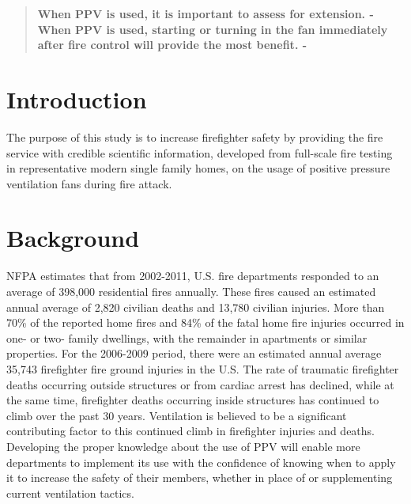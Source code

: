 \documentclass{article}
\begin{document}
\begin{abstract}
\noindent \bf{When PPV is used, it is important to assess for extension.} - \\

\noindent \bf{When PPV is used, starting or turning in the fan immediately after fire control will provide the most benefit.} - \\

\end{abstract}

\newpage

\tableofcontents

\newpage

\section*{Introduction}
The purpose of this study is to increase firefighter safety by providing the fire service with credible scientific information, developed from full-scale fire testing in representative modern single family homes, on the usage of positive pressure ventilation fans during fire attack. 

\clearpage

\section{Background}
NFPA estimates \cite{NFPAFireLoss} that from 2002-2011, U.S. fire departments responded to an average of 398,000 residential fires annually. These fires caused an estimated annual average of 2,820 civilian deaths and 13,780 civilian injuries. More than 70\% of the reported home fires and 84\% of the fatal home fire injuries occurred in one- or two- family dwellings, with the remainder in apartments or similar properties. For the 2006-2009 period, there were an estimated annual average 35,743 firefighter fire ground injuries in the U.S. \cite{NFPAFFInjuries} The rate of traumatic firefighter deaths occurring outside structures or from cardiac arrest has declined, while at the same time, firefighter deaths occurring inside structures has continued to climb over the past 30 years. \cite{NFPALast30} Ventilation is believed to be a significant contributing factor to this continued climb in firefighter injuries and deaths. Developing the proper knowledge about the use of PPV will enable more departments to implement its use with the confidence of knowing when to apply it to increase the safety of their members, whether in place of or supplementing current ventilation tactics.
\end{document}
